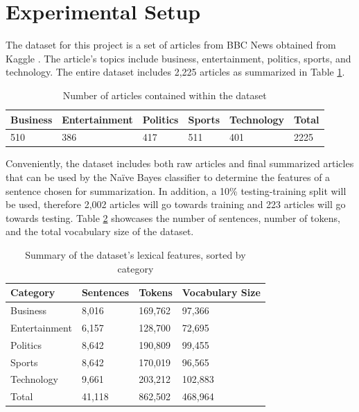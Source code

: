 \documentclass{IEEEtran}
\begin{document}
\section{Experimental Setup}
The dataset for this project is a set of articles from BBC News obtained from Kaggle \cite{dataset}. The article's topics include business, entertainment, politics, sports, and technology. The entire dataset includes 2,225 articles as summarized in Table \ref{table:dataset_article_count}.

\begin{table}[h]
\centering
\caption{Number of articles contained within the dataset}
\begin{tabular}{|l|l|l|l|l|l|}
\hline
Business & Entertainment & Politics & Sports & Technology & Total \\ \hline
510 & 386 & 417 & 511 & 401 & 2225 \\ \hline
\end{tabular}
\label{table:dataset_article_count}
\end{table}

Conveniently, the dataset includes both raw articles and final summarized articles that can be used by the Na\"{i}ve Bayes classifier to determine the features of a sentence chosen for summarization. In addition, a 10\% testing-training split will be used, therefore 2,002 articles will go towards training and 223 articles will go towards testing. Table \ref{table:dataset_summary} showcases the number of sentences, number of tokens, and the total vocabulary size of the dataset.

\begin{table}[h]
\centering
\caption{Summary of the dataset's lexical features, sorted by category}
\begin{tabular}{|l|l|l|l|}
\hline
Category    &Sentences  &Tokens     &Vocabulary Size \\ \hline
Business    &8,016      &169,762    &97,366 \\ \hline
Entertainment&6,157     &128,700    &72,695 \\ \hline
Politics    &8,642      &190,809    &99,455 \\ \hline
Sports      &8,642      &170,019    &96,565 \\ \hline
Technology  &9,661      &203,212    &102,883 \\ \hline
Total       &41,118     &862,502    &468,964 \\ \hline
\end{tabular}
\label{table:dataset_summary}
\end{table}
\end{document}
